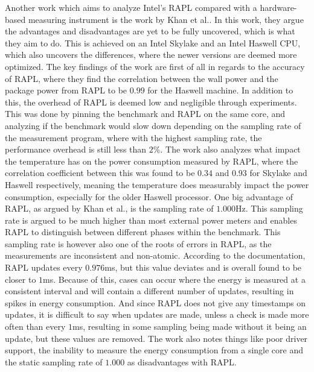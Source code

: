 Another work which aims to analyze Intel's RAPL compared with a hardware-based measuring instrument is the work by Khan et al.\cite*[]{RAPL_in_action}. In this work, they argue the advantages and disadvantages are yet to be fully uncovered, which is what they aim to do. This is achieved on an Intel Skylake and an Intel Haswell CPU, which also uncovers the differences, where the newer versions are deemed more optimized. The key findings of the work are first of all in regards to the accuracy of RAPL, where they find the correlation between the wall power and the package power from RAPL to be $0.99$ for the Haswell machine. In addition to this, the overhead of RAPL is deemed low and negligible through experiments. This was done by pinning the benchmark and RAPL on the same core, and analyzing if the benchmark would slow down depending on the sampling rate of the measurement program, where with the highest sampling rate, the performance overhead is still less than $2\%$. The work also analyzes what impact the temperature has on the power consumption measured by RAPL, where the correlation coefficient between this was found to be $0.34$ and $0.93$ for Skylake and Haswell respectively, meaning the temperature does measurably impact the power consumption, especially for the older Haswell processor. One big advantage of RAPL, as argued by Khan et al.\cite*[]{RAPL_in_action}, is the sampling rate of $1.000$Hz. This sampling rate is argued to be much higher than most external power meters and enables RAPL to distinguish between different phases within the benchmark. This sampling rate is however also one of the roots of errors in RAPL, as the measurements are inconsistent and non-atomic. According to the documentation, RAPL updates every $0.976$ms, but this value deviates and is overall found to be closer to $1$ms. Because of this, cases can occur where the energy is measured at a consistent interval and will contain a different number of updates, resulting in spikes in energy consumption. And since RAPL does not give any timestamps on updates, it is difficult to say when updates are made, unless a check is made more often than every $1$ms, resulting in some sampling being made without it being an update, but these values are removed. The work\cite*[]{RAPL_in_action} also notes things like poor driver support, the inability to measure the energy consumption from a single core and the static sampling rate of $1.000$ as disadvantages with RAPL.\cite*{RAPL_in_action}\nytafsnit


